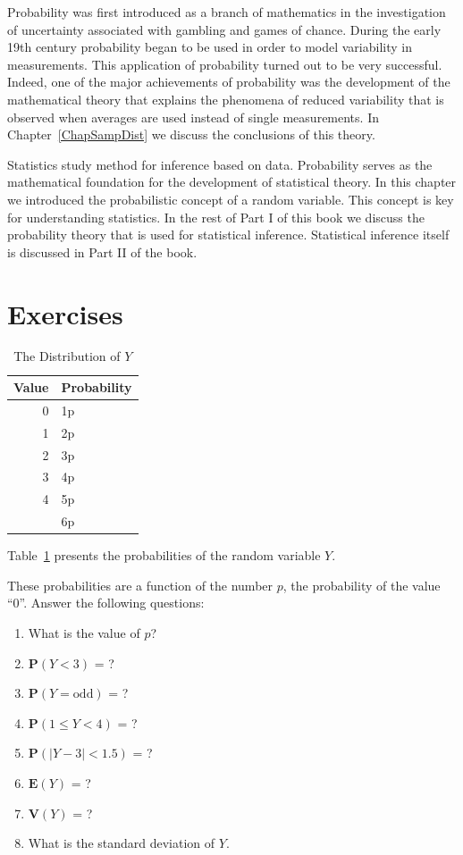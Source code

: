 \documentclass[
]{krantz}
\newcommand{\Expec}{\mathbf{E}}
\newcommand{\Prob}{\mathbf{P}}
\newcommand{\Var}{\mathbf{V}}
\theoremstyle{definition}
\theoremstyle{definition}
\theoremstyle{definition}
\theoremstyle{remark}
\let\BeginKnitrBlock\begin \let\EndKnitrBlock\end
\begin{document}
Probability was first introduced as a branch of mathematics in the
investigation of uncertainty associated with gambling and games of
chance. During the early 19th century probability began to be used in
order to model variability in measurements. This application of
probability turned out to be very successful. Indeed, one of the major
achievements of probability was the development of the mathematical
theory that explains the phenomena of reduced variability that is
observed when averages are used instead of single measurements. In
Chapter~\ref{ChapSampDist} we discuss the conclusions of this theory.

Statistics study method for inference based on data. Probability serves
as the mathematical foundation for the development of statistical
theory. In this chapter we introduced the probabilistic concept of a
random variable. This concept is key for understanding statistics. In
the rest of Part I of this book we discuss the probability theory that
is used for statistical inference. Statistical inference itself is
discussed in Part II of the book.

\hypertarget{exercises-3}{%
\section{Exercises}\label{exercises-3}}

\begin{table}[t]

\caption{\label{tab:tab4}The Distribution of $Y$}
\centering
\begin{tabular}{rl}
\toprule
Value & Probability\\
\midrule
0 & 1p\\
1 & 2p\\
2 & 3p\\
3 & 4p\\
4 & 5p\\
\addlinespace
5 & 6p\\
\bottomrule
\end{tabular}
\end{table}

\BeginKnitrBlock{exercise}
\protect\hypertarget{exr:unnamed-chunk-53}{}{\label{exr:unnamed-chunk-53} }Table~\ref{tab:tab4} presents the
probabilities of the random variable \(Y\).

These probabilities are a
function of the number \(p\), the probability of the value ``0''. Answer the
following questions:

\begin{enumerate}
\def\labelenumi{\arabic{enumi}.}
\item
  What is the value of \(p\)?
\item
  \(\Prob(Y <3 )\) = ?
\item
  \(\Prob(Y = \mbox{odd})\) = ?
\item
  \(\Prob(1 \leq Y < 4)\) = ?
\item
  \(\Prob(|Y -3| < 1.5)\) = ?
\item
  \(\Expec(Y)\) = ?
\item
  \(\Var(Y)\) = ?
\item
  What is the standard deviation of \(Y\).
\end{enumerate}
\EndKnitrBlock{exercise}
\end{document}

